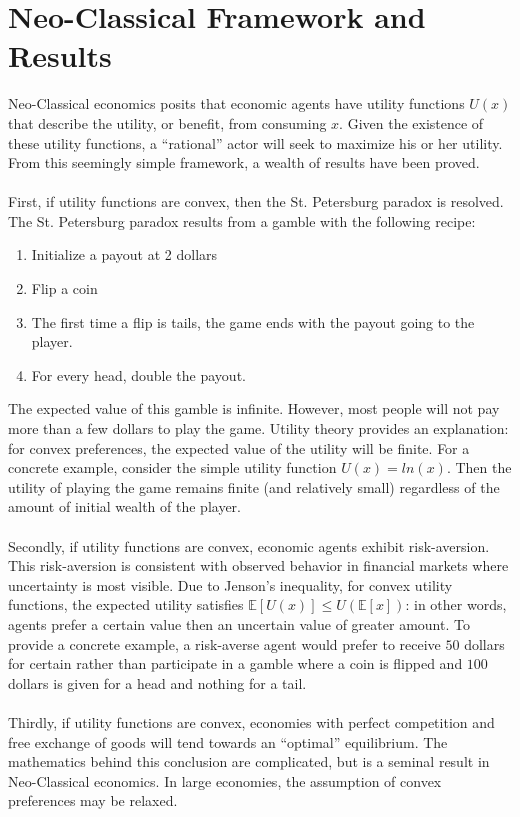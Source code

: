 \documentclass{article}
\begin{document}
\section{Neo-Classical Framework and Results}
Neo-Classical economics posits that economic agents have utility functions \(U(x)\) that describe the utility, or benefit, from consuming \(x\).  Given the existence of these utility functions, a ``rational'' actor will seek to maximize his or her utility.  From this seemingly simple framework, a wealth of results have been proved.  
\\
\\
First, if utility functions are convex, then the St. Petersburg paradox is resolved.  The St. Petersburg paradox results from a gamble with the following recipe:
\begin{enumerate}
	\item Initialize a payout at 2 dollars
	\item Flip a coin
	\item The first time a flip is tails, the game ends with the payout going to the player.
	\item For every head, double the payout.
\end{enumerate}
The expected value of this gamble is infinite.  However, most people will not pay more than a few dollars to play the game.  Utility theory provides an explanation: for convex preferences, the expected value of the utility will be finite.  For a concrete example, consider the simple utility function \(U(x)=ln(x)\).  Then the utility of playing the game remains finite (and relatively small) regardless of the amount of initial wealth of the player.  
\\
\\
Secondly, if utility functions are convex, economic agents exhibit risk-aversion.  This risk-aversion is consistent with observed behavior in financial markets where uncertainty is most visible.  Due to Jenson's inequality, for convex utility functions, the expected utility satisfies \(\mathbb{E}\left[U(x)\right] \leq U(\mathbb{E}[x])\): in other words, agents prefer a certain value then an uncertain value of greater amount.  To provide a concrete example, a risk-averse agent would prefer to receive \(50\) dollars for certain rather than participate in a gamble where a coin is flipped and \(100\) dollars is given for a head and nothing for a tail.  
\\
\\
Thirdly, if utility functions are convex, economies with perfect competition and free exchange of goods will tend towards an ``optimal'' equilibrium.  The mathematics behind this conclusion are complicated, but is a seminal result in Neo-Classical economics.  In large economies, the assumption of convex preferences may be relaxed.  
\end{document}
